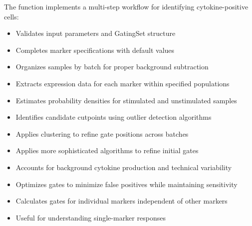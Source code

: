 \documentclass[letterpaper]{book}
\begin{document}
\begin{Details}
The function implements a multi-step workflow for identifying cytokine-positive cells:

\begin{itemize}

\item{} Validates input parameters and GatingSet structure
\item{} Completes marker specifications with default values
\item{} Organizes samples by batch for proper background subtraction

\end{itemize}


\begin{itemize}

\item{} Extracts expression data for each marker within specified populations
\item{} Estimates probability densities for stimulated and unstimulated samples
\item{} Identifies candidate cutpoints using outlier detection algorithms
\item{} Applies clustering to refine gate positions across batches

\end{itemize}


\begin{itemize}

\item{} Applies more sophisticated algorithms to refine initial gates
\item{} Accounts for background cytokine production and technical variability
\item{} Optimizes gates to minimize false positives while maintaining sensitivity

\end{itemize}


\begin{itemize}

\item{} Calculates gates for individual markers independent of other markers
\item{} Useful for understanding single-marker responses

\end{itemize}



\end{Details}
\end{document}
